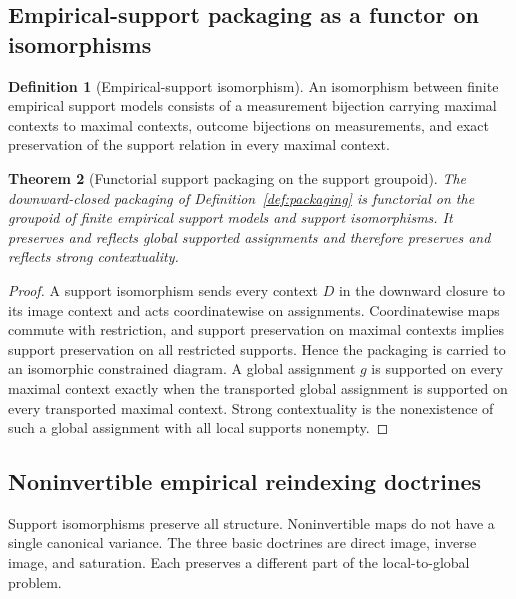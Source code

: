 \documentclass[11pt]{article}
\theoremstyle{plain}
\newtheorem{theorem}{Theorem}[section]
\theoremstyle{definition}
\newtheorem{definition}[theorem]{Definition}
\theoremstyle{remark}
\begin{document}
\subsection{Empirical-support packaging as a functor on isomorphisms}

\begin{definition}[Empirical-support isomorphism]
\label{def:empirical-support-isomorphism-monograph}
An isomorphism between finite empirical support models consists of a measurement
bijection carrying maximal contexts to maximal contexts, outcome bijections on
measurements, and exact preservation of the support relation in every maximal
context.
\end{definition}

\begin{theorem}[Functorial support packaging on the support groupoid]
\label{thm:support-packaging-functoriality-monograph}
The downward-closed packaging of Definition~\ref{def:packaging} is functorial on
the groupoid of finite empirical support models and support isomorphisms. It
preserves and reflects global supported assignments and therefore preserves and
reflects strong contextuality.
\end{theorem}

\begin{proof}
A support isomorphism sends every context $D$ in the downward closure to its
image context and acts coordinatewise on assignments. Coordinatewise maps commute
with restriction, and support preservation on maximal contexts implies support
preservation on all restricted supports. Hence the packaging is carried to an
isomorphic constrained diagram. A global assignment $g$ is supported on every
maximal context exactly when the transported global assignment is supported on
every transported maximal context. Strong contextuality is the nonexistence of
such a global assignment with all local supports nonempty.
\end{proof}

\subsection{Noninvertible empirical reindexing doctrines}
\label{subsec:noninvertible-empirical}

Support isomorphisms preserve all structure. Noninvertible maps do not have a
single canonical variance. The three basic doctrines are direct image, inverse
image, and saturation. Each preserves a different part of the local-to-global
problem.
\end{document}
